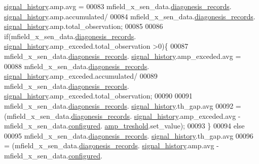 \begin{DoxyCode}
      \hyperlink{a00019_ab7038f4de1f77b52a7f89e9f77c0b846}{signal\_history}.amp.avg =
00083                         mfield\_x\_sen\_data.\hyperlink{a00025_a2bd79ce84bbd6b7f50d38954f7ae475e}{diagonesis\_records}.
      \hyperlink{a00019_ab7038f4de1f77b52a7f89e9f77c0b846}{signal\_history}.amp.accumulated/
00084                         mfield\_x\_sen\_data.\hyperlink{a00025_a2bd79ce84bbd6b7f50d38954f7ae475e}{diagonesis\_records}.
      \hyperlink{a00019_ab7038f4de1f77b52a7f89e9f77c0b846}{signal\_history}.amp.total\_observation;
00085 
00086             \textcolor{keywordflow}{if}(mfield\_x\_sen\_data.\hyperlink{a00025_a2bd79ce84bbd6b7f50d38954f7ae475e}{diagonesis\_records}.
      \hyperlink{a00019_ab7038f4de1f77b52a7f89e9f77c0b846}{signal\_history}.amp\_exceded.total\_observation >0)\{
00087                 mfield\_x\_sen\_data.\hyperlink{a00025_a2bd79ce84bbd6b7f50d38954f7ae475e}{diagonesis\_records}.
      \hyperlink{a00019_ab7038f4de1f77b52a7f89e9f77c0b846}{signal\_history}.amp\_exceded.avg =
00088                         mfield\_x\_sen\_data.\hyperlink{a00025_a2bd79ce84bbd6b7f50d38954f7ae475e}{diagonesis\_records}.
      \hyperlink{a00019_ab7038f4de1f77b52a7f89e9f77c0b846}{signal\_history}.amp\_exceded.accumulated/
00089                         mfield\_x\_sen\_data.\hyperlink{a00025_a2bd79ce84bbd6b7f50d38954f7ae475e}{diagonesis\_records}.
      \hyperlink{a00019_ab7038f4de1f77b52a7f89e9f77c0b846}{signal\_history}.amp\_exceded.total\_observation;
00090 
00091                 mfield\_x\_sen\_data.\hyperlink{a00025_a2bd79ce84bbd6b7f50d38954f7ae475e}{diagonesis\_records}.
      \hyperlink{a00019_ab7038f4de1f77b52a7f89e9f77c0b846}{signal\_history}.th\_gap.avg
00092                     = (mfield\_x\_sen\_data.\hyperlink{a00025_a2bd79ce84bbd6b7f50d38954f7ae475e}{diagonesis\_records}.
      \hyperlink{a00019_ab7038f4de1f77b52a7f89e9f77c0b846}{signal\_history}.amp\_exceded.avg - mfield\_x\_sen\_data.\hyperlink{a00025_a94b2d1f6ea4ab334c74d24984dd27843}{configured}.
      \hyperlink{a00021_a4b3bbfb0267daea1432f2603825ade62}{amp\_treshold}.set\_value);
00093             \}
00094             \textcolor{keywordflow}{else}
00095             mfield\_x\_sen\_data.\hyperlink{a00025_a2bd79ce84bbd6b7f50d38954f7ae475e}{diagonesis\_records}.
      \hyperlink{a00019_ab7038f4de1f77b52a7f89e9f77c0b846}{signal\_history}.th\_gap.avg
00096                     = (mfield\_x\_sen\_data.\hyperlink{a00025_a2bd79ce84bbd6b7f50d38954f7ae475e}{diagonesis\_records}.
      \hyperlink{a00019_ab7038f4de1f77b52a7f89e9f77c0b846}{signal\_history}.amp.avg - mfield\_x\_sen\_data.\hyperlink{a00025_a94b2d1f6ea4ab334c74d24984dd27843}{configured}.

\end{DoxyCode}
